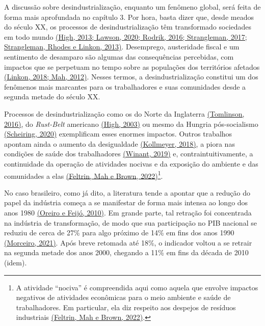 A discussão sobre desindustrialização, enquanto um fenômeno global, será
feita de forma mais aprofundada no capítulo 3. Por hora, basta dizer
que, desde meados do século XX, os processos de desindustrialização têm
transformado sociedades em todo mundo
\href{https://www.zotero.org/google-docs/?XIuSoy}{(High, 2013; Lawson,
2020; Rodrik, 2016; Strangleman, 2017; Strangleman, Rhodes e Linkon,
2013)}. Desemprego, austeridade fiscal e um sentimento de desamparo são
algumas das consequências percebidas, com impactos que se perpetuam no
tempo sobre as populações dos territórios afetados
\href{https://www.zotero.org/google-docs/?iOwmqp}{(Linkon, 2018; Mah,
2012)}. Nesses termos, a desindustrialização constitui um dos fenômenos
mais marcantes para os trabalhadores e suas comunidades desde a segunda
metade do século XX.

Processos de desindustrialização como os do Norte da Inglaterra
\href{https://www.zotero.org/google-docs/?U21Pvt}{(Tomlinson, 2016)}, do
\emph{Rust-Belt} americano
\href{https://www.zotero.org/google-docs/?9fBYil}{(High, 2003)} ou mesmo
da Hungria pós-socialismo
\href{https://www.zotero.org/google-docs/?QTEze5}{(Scheiring, 2020)}
exemplificam esses enormes impactos. Outros trabalhos apontam ainda o
aumento da desigualdade
\href{https://www.zotero.org/google-docs/?TXQfOB}{(Kollmeyer, 2018)}, a
piora nas condições de saúde dos trabalhadores
\href{https://www.zotero.org/google-docs/?W7X432}{(Winant, 2019)} e,
contraintuitivamente, a continuidade da operação de atividades nocivas e
da exposição do ambiente e das comunidades a elas
\href{https://www.zotero.org/google-docs/?1xHa2i}{(Feltrin, Mah e Brown,
2022)}\footnote{A atividade ``nociva'' é compreendida aqui como aquela
  que envolve impactos negativos de atividades econômicas para o meio
  ambiente e saúde de trabalhadores. Em particular, ela diz respeito aos
  despejos de resíduos industriais
  \href{https://www.zotero.org/google-docs/?0s96N7}{(Feltrin, Mah e
  Brown, 2022)}.}.

No caso brasileiro, como já dito, a literatura tende a apontar que a
redução do papel da indústria começa a se manifestar de forma mais
intensa ao longo dos anos 1980
\href{https://www.zotero.org/google-docs/?nIqXFH}{(Oreiro e Feijó,
2010)}. Em grande parte, tal retração foi concentrada na indústria de
transformação, de modo que sua participação no PIB nacional se reduziu
de cerca de 27\% para algo próximo de 14\% em fins dos anos 1990
\href{https://www.zotero.org/google-docs/?FecbJJ}{(Morceiro, 2021)}.
Após breve retomada até 18\%, o indicador voltou a se retrair na segunda
metade dos anos 2000, chegando a 11\% em fins da década de 2010 (idem).

